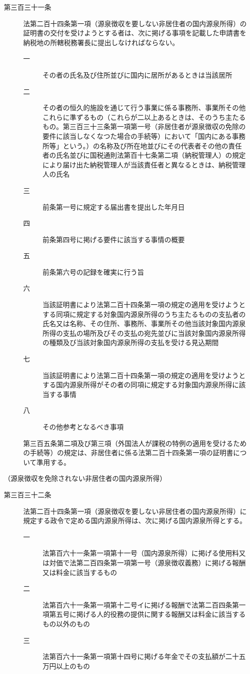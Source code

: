\documentclass[twocolumn,a4j,10pt]{ltjtarticle}
\begin{document}
\begin{description}
\item[第三百三十一条]法第二百十四条第一項（源泉徴収を要しない非居住者の国内源泉所得）の証明書の交付を受けようとする者は、次に掲げる事項を記載した申請書を納税地の所轄税務署長に提出しなければならない。
\begin{description}
\item[一]その者の氏名及び住所並びに国内に居所があるときは当該居所
\item[二]その者の恒久的施設を通じて行う事業に係る事務所、事業所その他これらに準ずるもの（これらが二以上あるときは、そのうち主たるもの。第三百三十三条第一項第一号（非居住者が源泉徴収の免除の要件に該当しなくなつた場合の手続等）において「国内にある事務所等」という。）の名称及び所在地並びにその代表者その他の責任者の氏名並びに国税通則法第百十七条第二項（納税管理人）の規定により届け出た納税管理人が当該責任者と異なるときは、納税管理人の氏名
\item[三]前条第一号に規定する届出書を提出した年月日
\item[四]前条第四号に掲げる要件に該当する事情の概要
\item[五]前条第六号の記録を確実に行う旨
\item[六]当該証明書により法第二百十四条第一項の規定の適用を受けようとする同項に規定する対象国内源泉所得のうち主たるものの支払者の氏名又は名称、その住所、事務所、事業所その他当該対象国内源泉所得の支払の場所及びその支払の宛先並びに当該対象国内源泉所得の種類及び当該対象国内源泉所得の支払を受ける見込期間
\item[七]当該証明書により法第二百十四条第一項の規定の適用を受けようとする国内源泉所得がその者の同項に規定する対象国内源泉所得に該当する事情
\item[八]その他参考となるべき事項
\end{description}
\item[]第三百五条第二項及び第三項（外国法人が課税の特例の適用を受けるための手続等）の規定は、非居住者に係る法第二百十四条第一項の証明書について準用する。
\end{description}
\noindent\hspace{10pt}（源泉徴収を免除されない非居住者の国内源泉所得）
\begin{description}
\item[第三百三十二条]法第二百十四条第一項（源泉徴収を要しない非居住者の国内源泉所得）に規定する政令で定める国内源泉所得は、次に掲げる国内源泉所得とする。
\begin{description}
\item[一]法第百六十一条第一項第十一号（国内源泉所得）に掲げる使用料又は対価で法第二百四条第一項第一号（源泉徴収義務）に掲げる報酬又は料金に該当するもの
\item[二]法第百六十一条第一項第十二号イに掲げる報酬で法第二百四条第一項第五号に掲げる人的役務の提供に関する報酬又は料金に該当するもの以外のもの
\item[三]法第百六十一条第一項第十四号に掲げる年金でその支払額が二十五万円以上のもの
\end{description}
\end{description}
\end{document}
